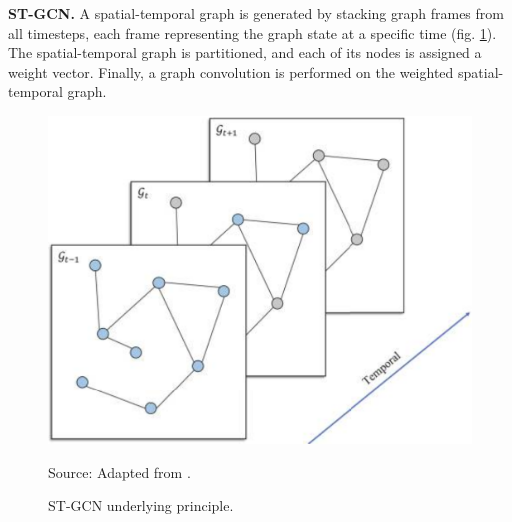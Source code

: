 \noindent
\textbf{ST-GCN.} A spatial-temporal graph is generated by stacking graph frames from all timesteps, each frame representing the graph state at a specific time (fig. \ref{fig:stgcn}).
The spatial-temporal graph is partitioned, and each of its nodes is assigned a weight vector.
Finally, a graph convolution is performed on the weighted spatial-temporal graph.
\begin{figure}[H]
   \centering
   \caption{ST-GCN underlying principle.}
   \includegraphics[scale=0.25]{stgcn.png}  \\
    \raggedright
    Source: Adapted from \cite{liu2019st-mgcn}.
   \label{fig:stgcn}
\end{figure}

